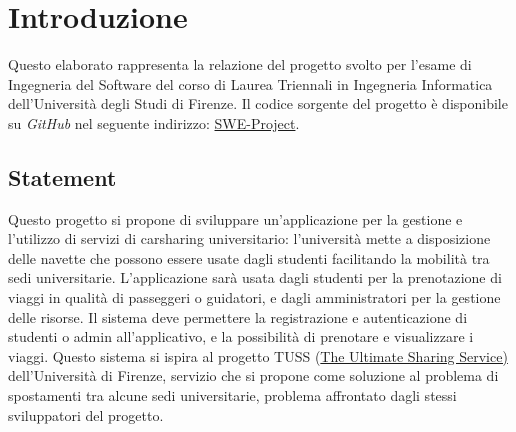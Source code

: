 \section{Introduzione}\label{sec:Introduzione}
Questo elaborato rappresenta la relazione del progetto svolto per l'esame di Ingegneria del Software del corso di Laurea Triennali in Ingegneria Informatica dell'Università degli Studi di Firenze.
Il codice sorgente del progetto è disponibile su \textit{GitHub} nel seguente indirizzo: \href{https://github.com/TommyAen/SWE-Project}{SWE-Project}.
\subsection{Statement}
Questo progetto si propone di sviluppare un'applicazione per la gestione e l'utilizzo di servizi di carsharing universitario: l'università mette a disposizione delle navette che possono essere usate dagli studenti facilitando la mobilità tra sedi universitarie.
\newline
L'applicazione sarà usata dagli studenti per la prenotazione di viaggi in qualità di passeggeri o guidatori, e dagli amministratori per la gestione delle risorse.
Il sistema deve permettere la registrazione e autenticazione di studenti o admin all'applicativo, e la possibilità di prenotare e visualizzare i viaggi.
Questo sistema si ispira al progetto TUSS (\href{https://www.tuss.unifi.it/}{The Ultimate Sharing Service)}  dell'Università di Firenze, servizio che si propone come soluzione al problema di spostamenti tra alcune sedi universitarie, problema affrontato dagli stessi sviluppatori del progetto.
